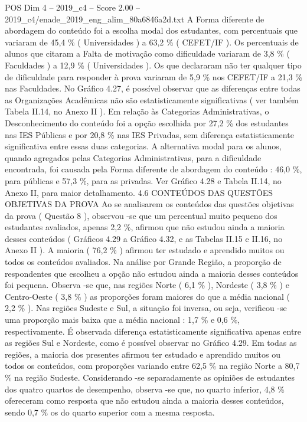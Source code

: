 \begin{textsample}{POS Dim 4 – 2019\_c4 – Score 2.00 – 2019\_c4/enade\_2019\_eng\_alim\_80a6846a2d.txt}
A Forma diferente de abordagem do conteúdo foi a escolha modal dos estudantes, com percentuais que variaram de 45,4 \% ( Universidades ) a 63,2 \% ( CEFET/IF ).
Os percentuais de alunos que citaram a Falta de motivação como dificuldade variaram de 3,8 \% ( Faculdades ) a 12,9 \% ( Universidades ).
Os que declararam não ter qualquer tipo de dificuldade para responder à prova variaram de 5,9 \% nos CEFET/IF a 21,3 \% nas Faculdades.
No Gráfico 4.27, é possível observar que as diferenças entre todas as Organizações Acadêmicas não são estatisticamente significativas ( ver também Tabela II.14, no Anexo II ).
Em relação às Categorias Administrativas, o Desconhecimento do conteúdo foi a opção escolhida por 27,2 \% dos estudantes nas IES Públicas e por 20,8 \% nas IES Privadas, sem diferença estatisticamente significativa entre essas duas categorias.
A alternativa modal para os alunos, quando agregados pelas Categorias Administrativas, para a dificuldade encontrada, foi causada pela Forma diferente de abordagem do conteúdo : 46,0 \%, para públicas e 57,3 \%, para as privadas.
Ver Gráfico 4.28 e Tabela II.14, no Anexo II, para maior detalhamento. 4.6 CONTEÚDOS DAS QUESTÕES OBJETIVAS DA PROVA Ao se analisarem os conteúdos das questões objetivas da prova ( Questão 8 ), observou -se que um percentual muito pequeno dos estudantes avaliados, apenas 2,2 \%, afirmou que não estudou ainda a maioria desses conteúdos ( Gráficos 4.29 a Gráfico 4.32, e as Tabelas II.15 e II.16, no Anexo II ).
A maioria ( 76,2 \% ) afirmou ter estudado e aprendido muitos ou todos os conteúdos avaliados.
Na análise por Grande Região, a proporção de respondentes que escolheu a opção não estudou ainda a maioria desses conteúdos foi pequena.
Observa -se que, nas regiões Norte ( 6,1 \% ), Nordeste ( 3,8 \% ) e Centro-Oeste ( 3,8 \% ) as proporções foram maiores do que a média nacional ( 2,2 \% ).
Nas regiões Sudeste e Sul, a situação foi inversa, ou seja, verificou -se uma proporção mais baixa que a média nacional : 1,7 \% e 0,6 \%, respectivamente.
É observada diferença estatisticamente significativa apenas entre as regiões Sul e Nordeste, como é possível observar no Gráfico 4.29.
Em todas as regiões, a maioria dos presentes afirmou ter estudado e aprendido muitos ou todos os conteúdos, com proporções variando entre 62,5 \% na região Norte a 80,7 \% na região Sudeste.
Considerando -se separadamente as opiniões de estudantes dos quatro quartos de desempenho, observa -se que, no quarto inferior, 4,8 \% ofereceram como resposta que não estudou ainda a maioria desses conteúdos, sendo 0,7 \% os do quarto superior com a mesma resposta.

\end{textsample}
